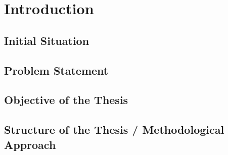 \chapter{Introduction}
\label{chap:introduction}

\section{Initial Situation}

\section{Problem Statement}

\section{Objective of the Thesis}

\section{Structure of the Thesis / Methodological Approach}
